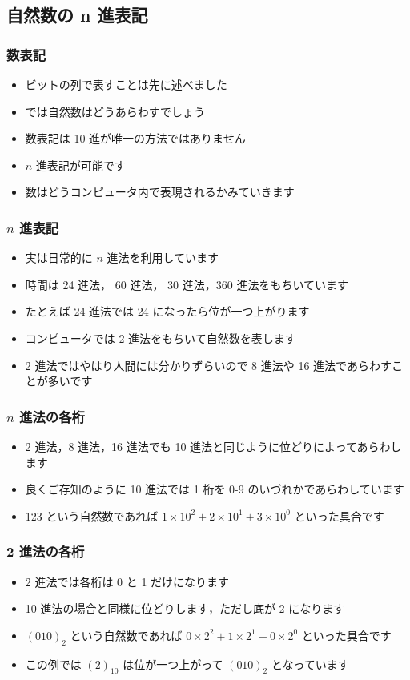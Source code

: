 \subsection{自然数の n 進表記}
\begin{frame}
\frametitle{数表記}
  \begin{itemize}
\item ビットの列で表すことは先に述べました
\item では自然数はどうあらわすでしょう
\item 数表記は 10 進が唯一の方法ではありません
\item $n$ 進表記が可能です
\item 数はどうコンピュータ内で表現されるかみていきます
  \end{itemize}
\end{frame}
\begin{frame}
\frametitle{$n$ 進表記}
  \begin{itemize}
\item 実は日常的に $n$ 進法を利用しています
\item 時間は 24 進法， 60 進法， 30 進法，360 進法をもちいています
\item たとえば 24 進法では 24 になったら位が一つ上がります
\item コンピュータでは 2 進法をもちいて自然数を表します
\item 2 進法ではやはり人間には分かりずらいので 8 進法や 16 進法であらわすことが多いです
  \end{itemize}
\end{frame}
\begin{frame}
\frametitle{$n$ 進法の各桁}
  \begin{itemize}
\item 2 進法，8 進法，16 進法でも 10 進法と同じように位どりによってあらわします
\item 良くご存知のように 10 進法では 1 桁を 0-9 のいづれかであらわしています
\item 123 という自然数であれば \(1\times 10^2+2\times 10^1+3\times 10^0\) といった具合です
  \end{itemize}
\end{frame}
\begin{frame}
\frametitle{2 進法の各桁}
  \begin{itemize}
\item 2 進法では各桁は 0 と 1 だけになります
\item 10 進法の場合と同様に位どりします，ただし底が 2 になります
\item \((010)_2\) という自然数であれば \(0\times 2^2+1\times 2^1+0\times 2^0\) といった具合です
\item この例では \((2)_{10}\) は位が一つ上がって \((010)_2\) となっています
  \end{itemize}
\end{frame}
